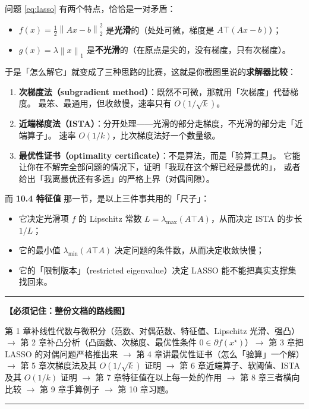 \documentclass[11pt,a4paper,UTF8]{ctexart}
\theoremstyle{plain}
\theoremstyle{definition}
\theoremstyle{remark}
\newcommand{\norm}[1]{\left\lVert #1 \right\rVert}
\newenvironment{keypoint}[1]
  {\par\medskip\noindent\begin{minipage}{\linewidth}%
   \hrule\smallskip\noindent\textbf{【必须记住：#1】}\par\nopagebreak\smallskip}
  {\smallskip\hrule\end{minipage}\medskip}
\begin{document}
问题 \eqref{eq:lasso} 有两个特点，恰恰是一对矛盾：

\begin{itemize}
\item $f(x)=\tfrac12\norm{Ax-b}_2^2$ 是\textbf{光滑}的（处处可微，梯度是 $A\top(Ax-b)$）；
\item $g(x)=\lambda\norm{x}_1$ 是\textbf{不光滑}的（在原点是尖的，没有梯度，只有次梯度）。
\end{itemize}

于是「怎么解它」就变成了三种思路的比赛，这就是你截图里说的\textbf{求解器比较}：

\begin{enumerate}
\item \textbf{次梯度法（subgradient method）}：既然不可微，那就用「次梯度」代替梯度。
      最笨、最通用，但收敛慢，速率只有 $O(1/\sqrt{k})$。
\item \textbf{近端梯度法（ISTA）}：分开处理——光滑的部分走梯度，不光滑的部分走「近端算子」。
      速率 $O(1/k)$，比次梯度法好一个数量级。
\item \textbf{最优性证书（optimality certificate）}：不是算法，而是「验算工具」。
      它能让你在不解完全部问题的情况下，证明「我现在这个解已经是最优的」，
      或者给出「我离最优还有多远」的严格上界（对偶间隙）。
\end{enumerate}

而 \textbf{10.4 特征值} 那一节，是以上三件事共用的「尺子」：
\begin{itemize}
\item 它决定光滑项 $f$ 的 Lipschitz 常数 $L=\lambda_{\max}(A\top A)$，从而决定 ISTA 的步长 $1/L$；
\item 它的最小值 $\lambda_{\min}(A\top A)$ 决定问题的条件数，从而决定收敛快慢；
\item 它的「限制版本」（restricted eigenvalue）决定 LASSO 能不能把真实支撑集找回来。
\end{itemize}

\begin{keypoint}{整份文档的路线图}
第 1 章补线性代数与微积分（范数、对偶范数、特征值、Lipschitz 光滑、强凸）$\to$
第 2 章补凸分析（凸函数、次梯度、最优性条件 $0\in\partial f(x^\star)$）$\to$
第 3 章把 LASSO 的对偶问题严格推出来 $\to$
第 4 章讲最优性证书（怎么「验算」一个解）$\to$
第 5 章次梯度法及其 $O(1/\sqrt{k})$ 证明 $\to$
第 6 章近端算子、软阈值、ISTA 及其 $O(1/k)$ 证明 $\to$
第 7 章特征值在以上每一处的作用 $\to$
第 8 章三者横向比较 $\to$ 第 9 章手算例子 $\to$ 第 10 章习题。
\end{keypoint}
\end{document}
